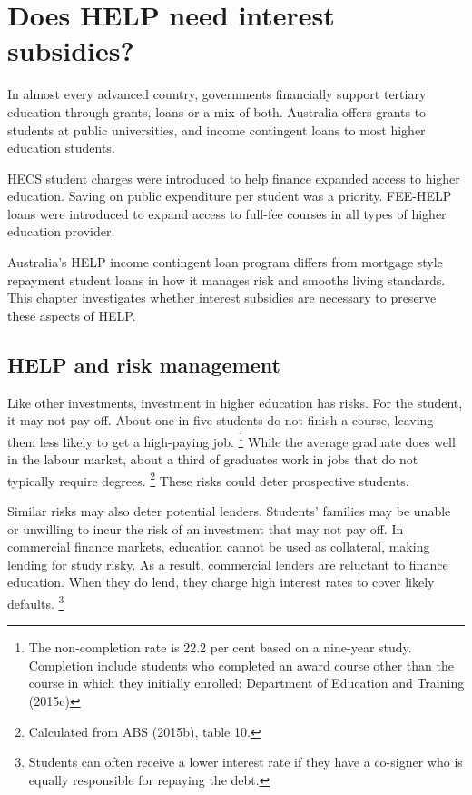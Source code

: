 \documentclass[embargoed]{grattan}
\begin{document}
\chapter{Does HELP need interest subsidies?}\label{chap:does-help-need-interest-subsidies}

In almost every advanced country, governments financially support tertiary education through grants, loans or a mix of both.
Australia offers grants to students at public universities, and income contingent loans to most higher education students.

HECS student charges were introduced to help finance expanded access to higher education.
Saving on public expenditure per student was a priority.
FEE-HELP loans were introduced to expand access to full-fee courses in all types of higher education provider.

Australia's HELP income contingent loan program differs from mortgage style repayment student loans in how it manages risk and smooths living standards.
This chapter investigates whether interest subsidies are necessary to preserve these aspects of HELP.

\section{HELP and risk management}\label{help-and-risk-management}

Like other investments, investment in higher education has risks.
For the student, it may not pay off.
About one in five students do not finish a course, leaving them less likely to get a high-paying job.%
\footnote{The non-completion rate is 22.2 per cent based on a nine-year study.
Completion include students who completed an award course other than the course in which they initially enrolled: Department of Education and Training (2015c)} While the average graduate does well in the labour market, about a third of graduates work in jobs that do not typically require degrees.%
\footnote{Calculated from ABS (2015b), table 10.} These risks could deter prospective students.

Similar risks may also deter potential lenders.
Students' families may be unable or unwilling to incur the risk of an investment that may not pay off.
In commercial finance markets, education cannot be used as collateral, making lending for study risky.
As a result, commercial lenders are reluctant to finance education.
When they do lend, they charge high interest rates to cover likely defaults.%
\footnote{Students can often receive a lower interest rate if they have a co-signer who is equally responsible for repaying the debt.}
\end{document}
